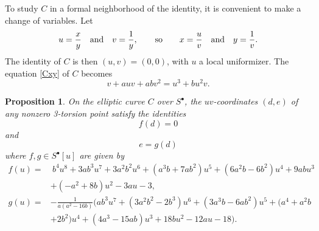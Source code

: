 \documentclass{gtpart}
\newtheorem{prop}[thm]{Proposition}
\theoremstyle{definition}
\theoremstyle{remark}
\newcommand{\ad}{{\rm and}}
\newcommand{\s}{S^\bullet}
\begin{document}
To study $C$ in a formal neighborhood of the identity, it is convenient to make a change of variables.  
Let 
\[
 u = \frac{x}{y} \quad \ad \quad v = \frac{1}{y}, \qquad {\rm so} \qquad x = \frac{u}{v} \quad \ad \quad y = \frac{1}{v}.  
\]
The identity of $C$ is then $(u,v) = (0,0)$, with $u$ a local uniformizer.  
The equation \eqref{Cxy} of $C$ becomes 
\begin{equation}
\label{Cuv}
 v + a u v + a b v^2 = u^3 + b u^2 v.  
\end{equation}

\begin{prop}
\label{prop:tors}
 On the elliptic curve $C$ over $\s$, the $uv$-coordinates $(d,e)$ of any nonzero 3-torsion point satisfy the identities 
 \begin{equation}
 \label{f}
  f(d) = 0 
 \end{equation}
 and 
 \begin{equation}
 \label{g}
  e = g(d) 
 \end{equation}
 where $f, g \in \s [u]$ are given by 
 \begin{equation*}
 \begin{split}
  f(u) = & ~ b^4 u^8 + 3 a b^3 u^7 + 3 a^2 b^2 u^6 + (a^3 b + 7 a b^2) u^5 + (6 a^2 b - 6 b^2) u^4 + 9 a b u^3 \\
         & + (-a^2 + 8 b) u^2 - 3 a u - 3, \\
  g(u) = & -\frac{1}{a (a^2 - 16 b)} \big( a b^3 u^7 + (3 a^2 b^2 - 2 b^3) u^6 + (3 a^3 b -6 a b^2) u^5 + (a^4 + a^2 b \\
         & + 2 b^2) u^4 + (4 a^3 - 15 a b) u^3 + 18 b u^2 - 12 a u - 18 \big).  
 \end{split}
 \end{equation*}
\end{prop}
\end{document}
